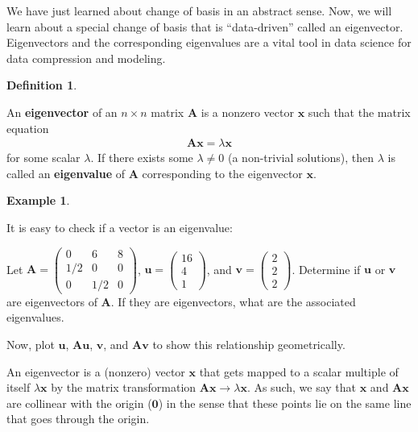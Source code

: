 \documentclass[
]{book}
\theoremstyle{definition}
\newtheorem{definition}{Definition}[chapter]
\theoremstyle{definition}
\newtheorem{example}{Example}[chapter]
\theoremstyle{definition}
\theoremstyle{remark}
\begin{document}
We have just learned about change of basis in an abstract sense. Now, we will learn about a special change of basis that is ``data-driven'' called an eigenvector. Eigenvectors and the corresponding eigenvalues are a vital tool in data science for data compression and modeling.

\begin{definition}
\protect\hypertarget{def:unlabeled-div-158}{}\label{def:unlabeled-div-158}

An \textbf{eigenvector} of an \(n \times n\) matrix \(\mathbf{A}\) is a nonzero vector \(\mathbf{x}\) such that the matrix equation
\[
\begin{aligned}
\mathbf{A} \mathbf{x} = \lambda \mathbf{x}
\end{aligned}
\]
for some scalar \(\lambda\). If there exists some \(\lambda \neq 0\) (a non-trivial solutions), then \(\lambda\) is called an \textbf{eigenvalue} of \(\mathbf{A}\) corresponding to the eigenvector \(\mathbf{x}\).

\end{definition}

\begin{example}
\protect\hypertarget{exm:unlabeled-div-159}{}\label{exm:unlabeled-div-159}

It is easy to check if a vector is an eigenvalue:

Let \(\mathbf{A} = \begin{pmatrix} 0 & 6 & 8 \\ 1/2 & 0 & 0 \\ 0 & 1/2 & 0 \end{pmatrix}\), \(\mathbf{u} = \begin{pmatrix} 16 \\ 4 \\ 1 \end{pmatrix}\), and \(\mathbf{v} = \begin{pmatrix} 2 \\ 2 \\ 2 \end{pmatrix}\). Determine if \(\mathbf{u}\) or \(\mathbf{v}\) are eigenvectors of \(\mathbf{A}\). If they are eigenvectors, what are the associated eigenvalues.

Now, plot \(\mathbf{u}\), \(\mathbf{A} \mathbf{u}\), \(\mathbf{v}\), and \(\mathbf{A} \mathbf{v}\) to show this relationship geometrically.

\end{example}

An eigenvector is a (nonzero) vector \(\mathbf{x}\) that gets mapped to a scalar multiple of itself \(\lambda \mathbf{x}\) by the matrix transformation \(\mathbf{A}\mathbf{x} \rightarrow \lambda \mathbf{x}\). As such, we say that \(\mathbf{x}\) and \(\mathbf{A} \mathbf{x}\) are collinear with the origin (\(\mathbf{0}\)) in the sense that these points lie on the same line that goes through the origin.
\end{document}
